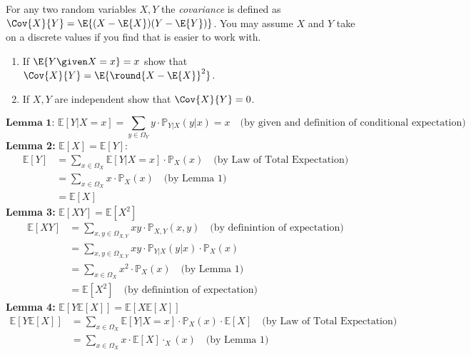 \documentclass{article}
\begin{document}
\begin{aprob}
    For any two random variables $X,Y$ the \emph{covariance} is defined as $\Cov{X}{Y}=\E{(X-\E{X})(Y-\E{Y})}$. 
    You may assume $X$ and $Y$ take on a discrete values if you find that is easier to work with.
    \begin{enumerate}
        \item {} If $\E{Y\given X=x} = x$ show that $\Cov{X}{Y} = \E{\round{X-\E{X}}^2}$.  
        \item {} If $X, Y$ are independent show that $\Cov{X}{Y}=0$.
    \end{enumerate}

    \begin{tcolorbox}[colback=lightgray!10!white, colframe=black, title=A2.a]
        \[
        \textbf{Lemma 1: }
        \mathbb{E}[Y|X=x] = \sum_{y \in \Omega_Y} y \cdot \mathbb{P}_{Y|X}(y|x) = x \quad \text{(by given and definition of conditional expectation)}
        \]
        \textbf{Lemma 2: } $\mathbb{E}[X] = \mathbb{E}[Y]$:
        \begin{align*}
        \mathbb{E}[Y] &= \sum_{x \in \Omega_X} \mathbb{E}[Y|X=x] \cdot \mathbb{P}_X(x) \quad \text{(by Law of Total Expectation)} \\
        &= \sum_{x \in \Omega_X} x \cdot \mathbb{P}_X(x) \quad \text{(by Lemma 1)}\\
        &= \mathbb{E}[X] \quad
        \end{align*}
        \textbf{Lemma 3: } $\mathbb{E}[XY] = \mathbb{E}[X^2]$
        \begin{align*}
        \mathbb{E}[XY] &= \sum_{x,y \in \Omega_{X,Y}} xy \cdot \mathbb{P}_{X,Y}(x,y) \quad \text{(by definintion of expectation)} \\
        &= \sum_{x,y \in \Omega_{X,Y}} xy \cdot \mathbb{P}_{Y|X}(y|x) \cdot \mathbb{P}_X(x) \\
        &= \sum_{x \in \Omega_X} x^2 \cdot \mathbb{P}_X(x) \quad \text{(by Lemma 1)}\\
        &= \mathbb{E}[X^2] \quad \text{(by definintion of expectation)}
        \end{align*}
        \textbf{Lemma 4: } $\mathbb{E}[Y\mathbb{E}[X]] = \mathbb{E}[X\mathbb{E}[X]]$
        \begin{align*}
        \mathbb{E}[Y\mathbb{E}[X]] &= \sum_{x \in \Omega_X} \mathbb{E}[Y|X=x] \cdot \mathbb{P}_X(x) \cdot \mathbb{E}[X] \quad \text{(by Law of Total Expectation)}\\
        &= \sum_{x \in \Omega_X} x \cdot \mathbb{E}[X] \cdot _X(x) \quad \text{(by Lemma 1)} \\

\end{align*}
\end{tcolorbox}
\end{aprob}
\end{document}
